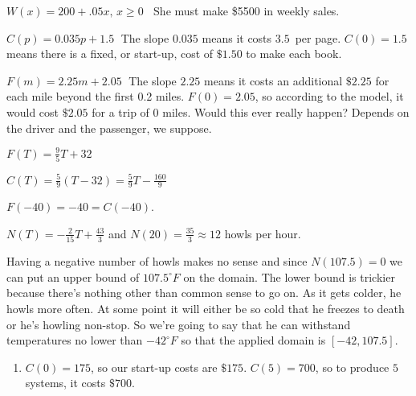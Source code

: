 \begin{exenum}

\item  $W(x) = 200 + .05x,\, x \geq 0\;\;$ She must make \$5500 in weekly sales.

\item  $C(p) = 0.035p + 1.5 \;$  The slope $0.035$ means it costs $3.5$\textcent \, per page.  $C(0) = 1.5$ means there is a fixed, or start-up, cost of $\$1.50$ to make each book.

\item $F(m) = 2.25m + 2.05 \;$  The slope $2.25$ means it costs an additional $\$2.25$ for each mile beyond the first 0.2 miles.  $F(0) = 2.05$, so according to the model, it would cost $\$2.05$ for a trip of $0$ miles.  Would this ever really happen?  Depends on the driver and the passenger, we suppose.

\item 

\begin{shortenumerate}
\item $F(T) = \frac{9}{5}T + 32$
\item $C(T) = \frac{5}{9}(T - 32) = \frac{5}{9}T - \frac{160}{9}$
\item $F(-40) = -40 = C(-40)$.
\end{shortenumerate}

\item $N(T) = -\frac{2}{15}T + \frac{43}{3}$  and $N(20) = \frac{35}{3} \approx 12$ howls per hour.

Having a negative number of howls makes no sense and since $N(107.5) = 0$ we can put an upper bound of $107.5^{\circ}F$ on the domain.  The lower bound is trickier because there's nothing other than common sense to go on.  As it gets colder, he howls more often.  At some point it will either be so cold that he freezes to death or he's howling non-stop.  So we're going to say that he can withstand temperatures no lower than $-42^{\circ}F$ so that the applied domain is $[-42, 107.5]$.

\item \begin{enumerate}

\item
  
$C(0) = 175$, so our start-up costs are $\$ 175$.  $C(5) = 700$, so to produce $5$ systems, it costs $\$ 700$.

\begin{center}


\end{center}
\end{enumerate}
\end{exenum}
